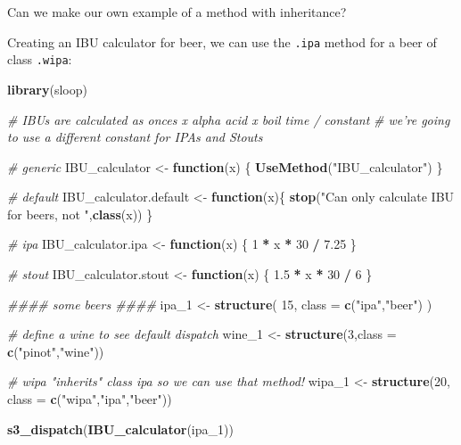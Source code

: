 \documentclass[]{book}
\newenvironment{Shaded}{\begin{snugshade}}{\end{snugshade}}
\newcommand{\CommentTok}[1]{\textcolor[rgb]{0.56,0.35,0.01}{\textit{#1}}}
\newcommand{\ControlFlowTok}[1]{\textcolor[rgb]{0.13,0.29,0.53}{\textbf{#1}}}
\newcommand{\DataTypeTok}[1]{\textcolor[rgb]{0.13,0.29,0.53}{#1}}
\newcommand{\DecValTok}[1]{\textcolor[rgb]{0.00,0.00,0.81}{#1}}
\newcommand{\FloatTok}[1]{\textcolor[rgb]{0.00,0.00,0.81}{#1}}
\newcommand{\KeywordTok}[1]{\textcolor[rgb]{0.13,0.29,0.53}{\textbf{#1}}}
\newcommand{\NormalTok}[1]{#1}
\newcommand{\OperatorTok}[1]{\textcolor[rgb]{0.81,0.36,0.00}{\textbf{#1}}}
\newcommand{\StringTok}[1]{\textcolor[rgb]{0.31,0.60,0.02}{#1}}
\begin{document}
Can we make our own example of a method with inheritance?

Creating an IBU calculator for beer, we can use the \texttt{.ipa} method for a beer of class \texttt{.wipa}:

\begin{Shaded}
\begin{Highlighting}[]
\KeywordTok{library}\NormalTok{(sloop)}

\CommentTok{# IBUs are calculated as onces x alpha acid x boil time / constant}
\CommentTok{# we're going to use a different constant for IPAs and Stouts}


\CommentTok{# generic}
\NormalTok{IBU_calculator <-}\StringTok{ }\ControlFlowTok{function}\NormalTok{(x) \{}
  \KeywordTok{UseMethod}\NormalTok{(}\StringTok{"IBU_calculator"}\NormalTok{)}
\NormalTok{\}}

\CommentTok{# default}
\NormalTok{IBU_calculator.default <-}\StringTok{ }\ControlFlowTok{function}\NormalTok{(x)\{}
  \KeywordTok{stop}\NormalTok{(}\StringTok{"Can only calculate IBU for beers, not "}\NormalTok{,}\KeywordTok{class}\NormalTok{(x))}
\NormalTok{\}}

\CommentTok{# ipa}
\NormalTok{IBU_calculator.ipa <-}\StringTok{ }\ControlFlowTok{function}\NormalTok{(x) \{}
  \DecValTok{1} \OperatorTok{*}\StringTok{ }\NormalTok{x }\OperatorTok{*}\StringTok{ }\DecValTok{30} \OperatorTok{/}\StringTok{ }\FloatTok{7.25}
\NormalTok{\}}

\CommentTok{# stout}
\NormalTok{IBU_calculator.stout <-}\StringTok{ }\ControlFlowTok{function}\NormalTok{(x) \{}
  \FloatTok{1.5} \OperatorTok{*}\StringTok{ }\NormalTok{x }\OperatorTok{*}\StringTok{ }\DecValTok{30} \OperatorTok{/}\StringTok{ }\DecValTok{6}
\NormalTok{\}}

\CommentTok{#### some beers ####}
\NormalTok{ipa_}\DecValTok{1}\NormalTok{ <-}\StringTok{ }\KeywordTok{structure}\NormalTok{(}
  \DecValTok{15}\NormalTok{, }\DataTypeTok{class =} \KeywordTok{c}\NormalTok{(}\StringTok{"ipa"}\NormalTok{,}\StringTok{"beer"}\NormalTok{)}
\NormalTok{)}

\CommentTok{# define a wine to see default dispatch}
\NormalTok{wine_}\DecValTok{1}\NormalTok{ <-}\StringTok{ }\KeywordTok{structure}\NormalTok{(}\DecValTok{3}\NormalTok{,}\DataTypeTok{class =} \KeywordTok{c}\NormalTok{(}\StringTok{"pinot"}\NormalTok{,}\StringTok{"wine"}\NormalTok{))}

\CommentTok{# wipa "inherits" class ipa so we can use that method!}
\NormalTok{wipa_}\DecValTok{1}\NormalTok{ <-}\StringTok{ }\KeywordTok{structure}\NormalTok{(}\DecValTok{20}\NormalTok{, }\DataTypeTok{class =} \KeywordTok{c}\NormalTok{(}\StringTok{"wipa"}\NormalTok{,}\StringTok{"ipa"}\NormalTok{,}\StringTok{"beer"}\NormalTok{))}

\KeywordTok{s3_dispatch}\NormalTok{(}\KeywordTok{IBU_calculator}\NormalTok{(ipa_}\DecValTok{1}\NormalTok{))}
\end{Highlighting}
\end{Shaded}
\end{document}
